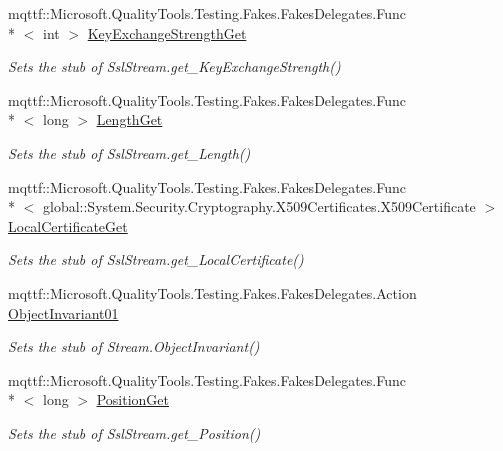 \begin{DoxyCompactItemize}
mqttf\-::\-Microsoft.\-Quality\-Tools.\-Testing.\-Fakes.\-Fakes\-Delegates.\-Func\\*
$<$ int $>$ \hyperlink{class_system_1_1_net_1_1_security_1_1_fakes_1_1_stub_ssl_stream_a77d0dcee6188410e77565d89b3b65245}{Key\-Exchange\-Strength\-Get}
\begin{DoxyCompactList}\small\item\em Sets the stub of Ssl\-Stream.\-get\-\_\-\-Key\-Exchange\-Strength()\end{DoxyCompactList}\item 
mqttf\-::\-Microsoft.\-Quality\-Tools.\-Testing.\-Fakes.\-Fakes\-Delegates.\-Func\\*
$<$ long $>$ \hyperlink{class_system_1_1_net_1_1_security_1_1_fakes_1_1_stub_ssl_stream_af9b197d550bc7692ce678c2601c69ed9}{Length\-Get}
\begin{DoxyCompactList}\small\item\em Sets the stub of Ssl\-Stream.\-get\-\_\-\-Length()\end{DoxyCompactList}\item 
mqttf\-::\-Microsoft.\-Quality\-Tools.\-Testing.\-Fakes.\-Fakes\-Delegates.\-Func\\*
$<$ global\-::\-System.\-Security.\-Cryptography.\-X509\-Certificates.\-X509\-Certificate $>$ \hyperlink{class_system_1_1_net_1_1_security_1_1_fakes_1_1_stub_ssl_stream_a8234779ef574a75bd3cc4b7d75e411eb}{Local\-Certificate\-Get}
\begin{DoxyCompactList}\small\item\em Sets the stub of Ssl\-Stream.\-get\-\_\-\-Local\-Certificate()\end{DoxyCompactList}\item 
mqttf\-::\-Microsoft.\-Quality\-Tools.\-Testing.\-Fakes.\-Fakes\-Delegates.\-Action \hyperlink{class_system_1_1_net_1_1_security_1_1_fakes_1_1_stub_ssl_stream_a99840e693b0ecff97f3a4958482aefea}{Object\-Invariant01}
\begin{DoxyCompactList}\small\item\em Sets the stub of Stream.\-Object\-Invariant()\end{DoxyCompactList}\item 
mqttf\-::\-Microsoft.\-Quality\-Tools.\-Testing.\-Fakes.\-Fakes\-Delegates.\-Func\\*
$<$ long $>$ \hyperlink{class_system_1_1_net_1_1_security_1_1_fakes_1_1_stub_ssl_stream_af6efd17fa4b8810bea5a38b34f41c5a0}{Position\-Get}
\begin{DoxyCompactList}\small\item\em Sets the stub of Ssl\-Stream.\-get\-\_\-\-Position()\end{DoxyCompactList}\item 

\end{DoxyCompactItemize}
